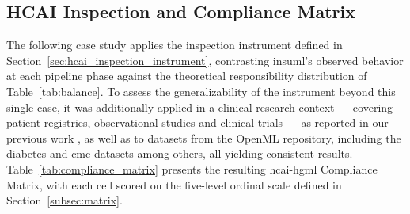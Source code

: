 \documentclass[a4paper,twoside]{article}
\begin{document}
\subsection{HCAI Inspection and Compliance Matrix}

The following case study applies the inspection instrument defined in Section~\ref{sec:hcai_inspection_instrument}, contrasting \gls{insuml}'s observed behavior at each pipeline phase against the theoretical responsibility distribution of Table~\ref{tab:balance}. To assess the generalizability of the instrument beyond this single case, it was additionally applied in a clinical research context --- covering patient registries, observational studies and clinical trials --- as reported in our previous work \cite{garciaprieto2026towards}, as well as to datasets from the OpenML repository, including the diabetes and cmc datasets among others, all yielding consistent results. Table~\ref{tab:compliance_matrix} presents the resulting \gls{hcai}-\gls{hgml} Compliance Matrix, with each cell scored on the five-level ordinal scale defined in Section~\ref{subsec:matrix}.
\end{document}
